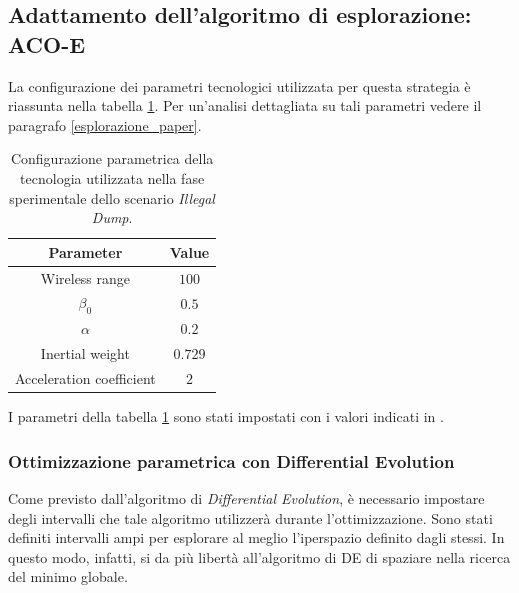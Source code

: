 \subsection{Adattamento dell'algoritmo di esplorazione: ACO-E}

La configurazione dei parametri tecnologici utilizzata per questa strategia è riassunta nella tabella \ref{tabella_parametri_dump_ACO}.
Per un'analisi dettagliata su tali parametri vedere il paragrafo \ref{esplorazione_paper}.

\begin{table}[H]
    \centering
    \captionsetup{justification=centering, margin=2cm, font=footnotesize}
    \begin{tabular}{|c|c|}
    \hline
    \textbf{Parameter}                      & \textbf{Value}        \\ \hline
    Wireless range                          & $100$                 \\ \hline
    $\beta_{0}$                             & $0.5$                 \\ \hline
    $\alpha$                                & $0.2$                 \\ \hline
    Inertial weight                         & $0.729$               \\ \hline
    Acceleration coefficient                & $2$                   \\ \hline
    \end{tabular}%
    
    \caption{Configurazione parametrica della tecnologia utilizzata nella fase sperimentale dello scenario \textit{Illegal Dump}.}
    \label{tabella_parametri_dump_ACO}
\end{table}
I parametri della tabella \ref{tabella_parametri_dump_ACO} sono stati impostati con i valori indicati in \cite{palmieri2017comparison}.

\subsubsection{Ottimizzazione parametrica con Differential Evolution}

Come previsto dall'algoritmo di \textit{Differential Evolution}, è necessario impostare degli intervalli che tale algoritmo utilizzerà durante l'ottimizzazione.
Sono stati definiti intervalli ampi per esplorare al meglio l'iperspazio definito dagli stessi.
In questo modo, infatti, si da più libertà all'algoritmo di DE di spaziare nella ricerca del minimo globale.


